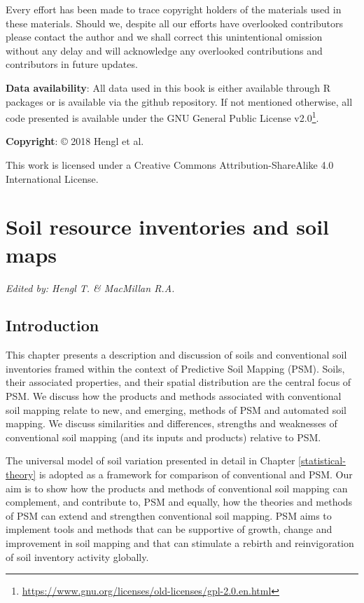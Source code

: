 \documentclass[11pt]{krantz}
\renewcommand{\href}[2]{#2\footnote{\url{#1}}}
\theoremstyle{definition}
\theoremstyle{definition}
\theoremstyle{definition}
\theoremstyle{remark}
\begin{document}
Every effort has been made to trace copyright holders of the materials
used in these materials. Should we, despite all our efforts have
overlooked contributors please contact the author and we shall correct
this unintentional omission without any delay and will acknowledge any
overlooked contributions and contributors in future updates.

\textbf{Data availability}: All data used in this book is either
available through R packages or is available via the github repository.
If not mentioned otherwise, all code presented is available under the
\href{https://www.gnu.org/licenses/old-licenses/gpl-2.0.en.html}{GNU
General Public License v2.0}.

\textbf{Copyright}: © 2018 Hengl et al.

This work is licensed under a Creative Commons Attribution-ShareAlike
4.0 International License.

\hypertarget{introduction}{%
\chapter{Soil resource inventories and soil maps}\label{introduction}}

\emph{Edited by: Hengl T. \& MacMillan R.A.}

\hypertarget{introduction-1}{%
\section{Introduction}\label{introduction-1}}

This chapter presents a description and discussion of soils and
conventional soil inventories framed within the context of Predictive
Soil Mapping (PSM). Soils, their associated properties, and their
spatial distribution are the central focus of PSM. We discuss how the
products and methods associated with conventional soil mapping relate to
new, and emerging, methods of PSM and automated soil mapping. We discuss
similarities and differences, strengths and weaknesses of conventional
soil mapping (and its inputs and products) relative to PSM.

The universal model of soil variation presented in detail in Chapter
\ref{statistical-theory} is adopted as a framework for comparison of
conventional and PSM. Our aim is to show how the products and methods of
conventional soil mapping can complement, and contribute to, PSM and
equally, how the theories and methods of PSM can extend and strengthen
conventional soil mapping. PSM aims to implement tools and methods that
can be supportive of growth, change and improvement in soil mapping and
that can stimulate a rebirth and reinvigoration of soil inventory
activity globally.
\end{document}
